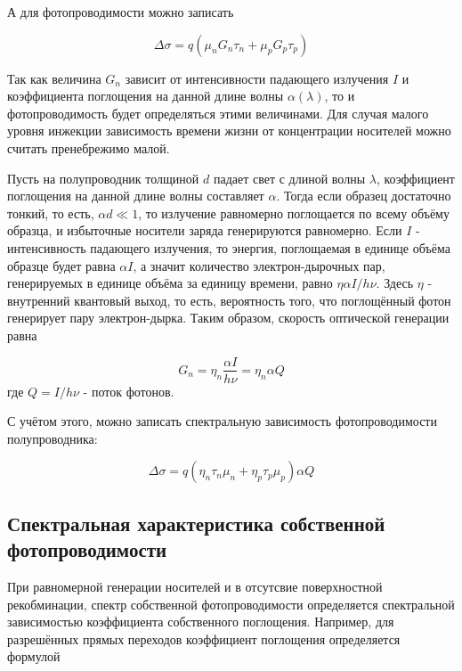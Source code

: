 А для фотопроводимости можно записать

\begin{equation}
\Delta \sigma = q (\mu_{n} G_{n} \tau_{n} + \mu_{p} G_{p} \tau_{p})
\end{equation}

Так как величина $G_{n}$ зависит от интенсивности падающего излучения $I$ и коэффициента поглощения на данной длине волны $\alpha(\lambda)$, то и фотопроводимость будет определяться этими величинами. Для случая малого уровня инжекции зависимость времени жизни от концентрации носителей можно считать пренебрежимо малой.

Пусть на полупроводник толщиной $d$ падает свет с длиной волны $\lambda$, коэффициент поглощения на данной длине волны составляет $\alpha$. Тогда если образец достаточно тонкий, то есть, $\alpha d \ll 1$, то излучение равномерно поглощается по всему объёму образца, и избыточные носители заряда генерируются равномерно. Если $I$ - интенсивность падающего излучения, то энергия, поглощаемая в единице объёма образце будет равна $\alpha I$, а значит количество электрон-дырочных пар, генерируемых в единице объёма за единицу времени, равно $\eta \alpha I / h \nu$. Здесь $\eta$ - внутренний квантовый выход, то есть, вероятность того, что поглощённый фотон генерирует пару электрон-дырка.
Таким образом, скорость оптической генерации равна

\begin{equation}
G_{n} = \eta_{n} \frac{\alpha I}{h \nu} = \eta_{n} \alpha Q
\end{equation}
где $Q = I / h \nu$  - поток фотонов.

С учётом этого, можно записать спектральную зависимость фотопроводимости полупроводника:

\begin{equation}
\Delta \sigma = q (\eta_{n} \tau_{n} \mu_{n} + \eta_{p} \tau_{p} \mu_{p}) \alpha Q
\end{equation}

\subsection{Спектральная характеристика собственной фотопроводимости}
При равномерной генерации носителей и в отсутсвие поверхностной рекобминации, спектр собственной фотопроводимости определяется спектральной зависимостью коэффициента собственного поглощения. Например, для разрешённых прямых переходов коэффициент поглощения определяется формулой

